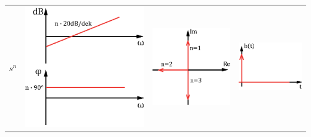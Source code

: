\begin{tabular}{>{\centering\arraybackslash}p{1.5cm}|>{\centering\arraybackslash}p{2.5cm}|>{\centering\arraybackslash}p{2cm}|>{\centering\arraybackslash}p{2.5cm}}
\hline \rule[-2ex]{0pt}{5.5ex} $s^n$ & \includegraphics[scale = 0.3]{../fig/bode_sn.eps} & \includegraphics[scale = 0.4]{../fig/ort_sn.eps}  & \includegraphics[scale = 0.5]{../fig/spr_sn.eps}  \\ 

\end{tabular}
